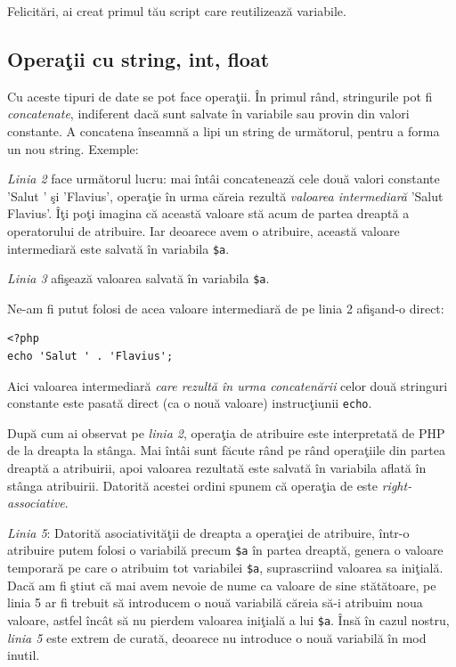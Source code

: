 Felicitări, ai creat primul tău script care reutilizează variabile.

\subsection{Operaţii cu string, int, float}
Cu aceste tipuri de date se pot face operaţii. În primul rând,
stringurile pot fi \textsl{concatenate}, indiferent dacă sunt salvate
în variabile sau provin din valori constante. A concatena
înseamnă a lipi un string de următorul, pentru a forma un nou string.
Exemple:


\textit{Linia 2} face următorul lucru: mai întâi concatenează cele două valori constante
'Salut ' şi 'Flavius', operaţie în urma căreia rezultă \textsl{valoarea intermediară}
'Salut Flavius'. Îţi poţi imagina că această valoare stă acum de partea
dreaptă a operatorului de atribuire. Iar deoarece avem o atribuire, această
valoare intermediară este salvată în variabila \texttt{\$a}.

\textit{Linia 3} afişează valoarea salvată în variabila \texttt{\$a}.

Ne-am fi putut folosi de acea {\glqq}valoare intermediară{\grqq} de pe linia 2 afişand-o direct:
\begin{lstlisting}
<?php
echo 'Salut ' . 'Flavius';
\end{lstlisting}
Aici valoarea intermediară \textit{care rezultă în urma concatenării} celor două stringuri
constante este pasată direct (ca o nouă valoare) instrucţiunii \texttt{echo}.

După cum ai observat pe \textit{linia 2}, operaţia de atribuire este interpretată
de PHP de la dreapta la stânga. Mai întâi sunt făcute rând pe rând operaţiile
din partea dreaptă a atribuirii, apoi valoarea rezultată este salvată în
variabila aflată în stânga atribuirii. Datorită acestei ordini spunem că
operaţia de  este \textsl{right-associative}.

\textit{Linia 5}: Datorită asociativităţii de dreapta a operaţiei de atribuire,
într-o atribuire putem folosi o variabilă precum \texttt{\$a} în partea dreaptă, genera
o valoare temporară pe care o atribuim tot variabilei \texttt{\$a}, suprascriind
valoarea sa iniţială. Dacă am fi ştiut că mai avem nevoie de nume ca valoare
de sine stătătoare, pe linia 5 ar fi trebuit să introducem o nouă variabilă
căreia să-i atribuim noua valoare,
astfel încât să nu pierdem valoarea iniţială a lui \texttt{\$a}.
Însă în cazul nostru, \textit{linia 5} este extrem de curată,
deoarece nu introduce o nouă variabilă în mod inutil.

